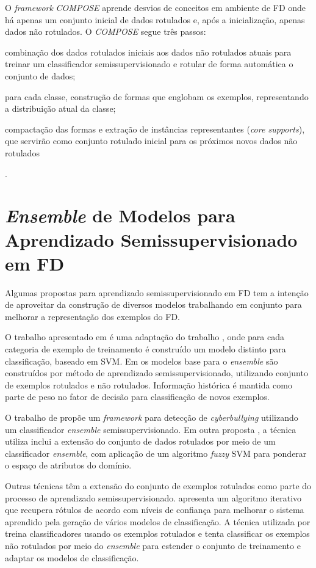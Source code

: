 O \emph{framework} \emph{COMPOSE} \cite{Dyer2014} aprende desvios de conceitos em ambiente de FD onde há apenas um conjunto inicial de dados rotulados e, após a inicialização, apenas dados não rotulados. O \emph{COMPOSE} segue três passos:
\begin{enumerate*}[label=\itshape\arabic*\upshape)]
\item combinação dos dados rotulados iniciais aos dados não rotulados atuais para treinar um classificador semissupervisionado e rotular de forma automática o conjunto de dados;
\item para cada classe, construção de formas que englobam os exemplos, representando a distribuição atual da classe;
\item compactação das formas e extração de instâncias representantes (\emph{core supports}), que servirão como conjunto rotulado inicial para os próximos novos dados não rotulados
\end{enumerate*}.

\section{\emph{Ensemble} de Modelos para Aprendizado Semissupervisionado em FD}

Algumas propostas para aprendizado semissupervisionado em FD tem a intenção de aproveitar da construção de diversos modelos trabalhando em conjunto para melhorar a representação dos exemplos do FD.

O trabalho apresentado em \cite{Zhang2012} é uma adaptação do trabalho \cite{Zhang2009}, onde para cada categoria de exemplo de treinamento é construído um modelo distinto para classificação, baseado em SVM. Em \cite{Zhang2014a} os modelos base para o \emph{ensemble} são construídos por método de aprendizado semissupervisionado, utilizando conjunto de exemplos rotulados e não rotulados. Informação histórica é mantida como parte de peso no fator de decisão para classificação de novos exemplos.

O trabalho de  propõe um \emph{framework} para detecção de \emph{cyberbullying} utilizando um classificador \emph{ensemble} semissupervisionado. Em outra proposta \cite{Nahar2014}, a técnica utiliza inclui a extensão do conjunto de dados rotulados por meio de um classificador \emph{ensemble}, com aplicação de um algoritmo \emph{fuzzy} SVM para ponderar o espaço de atributos do domínio.

Outras técnicas têm a extensão do conjunto de exemplos rotulados como parte do processo de aprendizado semissupervisionado.  apresenta um algoritmo iterativo que recupera rótulos de acordo com níveis de confiança para melhorar o sistema aprendido pela geração de vários modelos de classificação. A técnica utilizada por  treina classificadores usando os exemplos rotulados e tenta classificar os exemplos não rotulados por meio do \emph{ensemble} para estender o conjunto de treinamento e adaptar os modelos de classificação.

